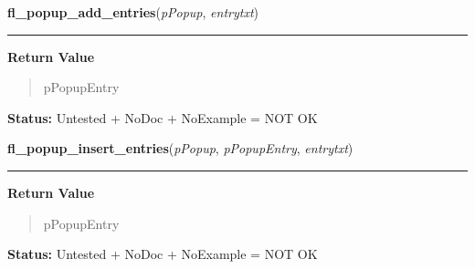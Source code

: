 \hspace{.8\funcindent}\begin{boxedminipage}{\funcwidth}

    \raggedright \textbf{fl\_popup\_add\_entries}(\textit{pPopup}, \textit{entrytxt})

    \vspace{-1.5ex}

    \rule{\textwidth}{0.5\fboxrule}
\setlength{\parskip}{2ex}
\setlength{\parskip}{1ex}
      \textbf{Return Value}
    \vspace{-1ex}

      \begin{quote}
      pPopupEntry

      \end{quote}

\textbf{Status:} Untested + NoDoc + NoExample = NOT OK



    \end{boxedminipage}

    \label{xformslib:library:fl_popup_insert_entries}

    \vspace{0.5ex}

\hspace{.8\funcindent}\begin{boxedminipage}{\funcwidth}

    \raggedright \textbf{fl\_popup\_insert\_entries}(\textit{pPopup}, \textit{pPopupEntry}, \textit{entrytxt})

    \vspace{-1.5ex}

    \rule{\textwidth}{0.5\fboxrule}
\setlength{\parskip}{2ex}
\setlength{\parskip}{1ex}
      \textbf{Return Value}
    \vspace{-1ex}

      \begin{quote}
      pPopupEntry

      \end{quote}

\textbf{Status:} Untested + NoDoc + NoExample = NOT OK



    \end{boxedminipage}

    \label{xformslib:library:fl_popup_create}

